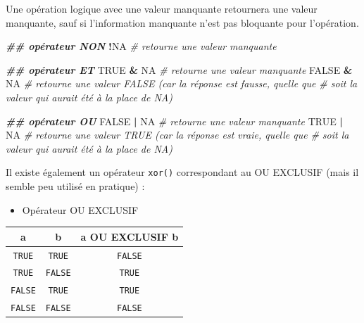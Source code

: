 \documentclass[
]{book}
\newenvironment{Shaded}{\begin{snugshade}}{\end{snugshade}}
\newcommand{\CommentTok}[1]{\textcolor[rgb]{0.56,0.35,0.01}{\textit{#1}}}
\newcommand{\ConstantTok}[1]{\textcolor[rgb]{0.56,0.35,0.01}{#1}}
\newcommand{\DocumentationTok}[1]{\textcolor[rgb]{0.56,0.35,0.01}{\textbf{\textit{#1}}}}
\newcommand{\SpecialCharTok}[1]{\textcolor[rgb]{0.81,0.36,0.00}{\textbf{#1}}}
\newcounter{none} %
\providecommand{\tightlist}{%
  \setlength{\itemsep}{0pt}\setlength{\parskip}{0pt}}
\begin{document}
Une opération logique avec une valeur manquante retournera une valeur manquante, sauf si l'information manquante n'est pas bloquante pour l'opération.

\begin{Shaded}
\begin{Highlighting}[]
\DocumentationTok{\#\# opérateur NON}
\SpecialCharTok{!}\ConstantTok{NA} \CommentTok{\# retourne une valeur manquante}

\DocumentationTok{\#\# opérateur ET}
\ConstantTok{TRUE} \SpecialCharTok{\&} \ConstantTok{NA} \CommentTok{\# retourne une valeur manquante}
\ConstantTok{FALSE} \SpecialCharTok{\&} \ConstantTok{NA} \CommentTok{\# retourne une valeur FALSE (car la réponse est fausse, quelle que }
           \CommentTok{\# soit la valeur qui aurait été à la place de NA)}

\DocumentationTok{\#\# opérateur OU}
\ConstantTok{FALSE} \SpecialCharTok{|} \ConstantTok{NA} \CommentTok{\# retourne une valeur manquante}
\ConstantTok{TRUE} \SpecialCharTok{|} \ConstantTok{NA} \CommentTok{\# retourne une valeur TRUE (car la réponse est vraie, quelle que }
           \CommentTok{\# soit la valeur qui aurait été à la place de NA)}
\end{Highlighting}
\end{Shaded}

Il existe également un opérateur \texttt{xor()} correspondant au OU EXCLUSIF (mais il semble peu utilisé en pratique) :

\begin{itemize}
\tightlist
\item
  Opérateur OU EXCLUSIF
\end{itemize}

{\def\LTcaptype{none} %
\begin{longtable}[]{@{}ccc@{}}
\toprule\noalign{}
a & b & a OU EXCLUSIF b \\
\midrule\noalign{}
\endhead
\bottomrule\noalign{}
\endlastfoot
\texttt{TRUE} & \texttt{TRUE} & \texttt{FALSE} \\
\texttt{TRUE} & \texttt{FALSE} & \texttt{TRUE} \\
\texttt{FALSE} & \texttt{TRUE} & \texttt{TRUE} \\
\texttt{FALSE} & \texttt{FALSE} & \texttt{FALSE} \\
\end{longtable}
}
\end{document}
